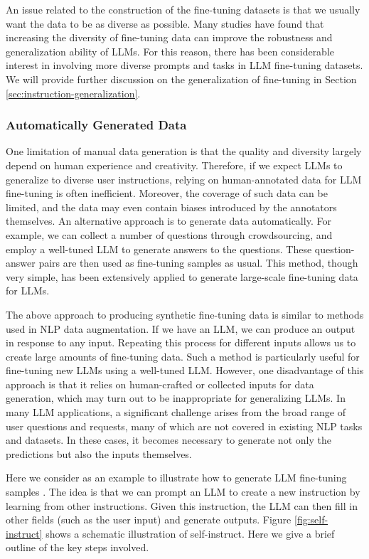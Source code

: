 An issue related to the construction of the fine-tuning datasets is that we usually want the data to be as diverse as possible. Many studies have found that increasing the diversity of fine-tuning data can improve the robustness and generalization ability of LLMs. For this reason, there has been considerable interest in involving more diverse prompts and tasks in LLM fine-tuning datasets. We will provide further discussion on the generalization of fine-tuning in Section \ref{sec:instruction-generalization}.

\subsubsection{Automatically Generated Data}

\noindent One limitation of manual data generation is that the quality and diversity largely depend on human experience and creativity. Therefore, if we expect LLMs to generalize to diverse user instructions, relying on human-annotated data for LLM fine-tuning is often inefficient. Moreover, the coverage of such data can be limited, and the data may even contain biases introduced by the annotators themselves. An alternative approach is to generate data automatically. For example, we can collect a number of questions through crowdsourcing, and employ a well-tuned LLM to generate answers to the questions. These question-answer pairs are then used as fine-tuning samples as usual. This method, though very simple, has been extensively applied to generate large-scale fine-tuning data for LLMs.

The above approach to producing synthetic fine-tuning data is similar to methods used in NLP data augmentation. If we have an LLM, we can produce an output in response to any input. Repeating this process for different inputs allows us to create large amounts of fine-tuning data.  Such a method is particularly useful for fine-tuning new LLMs using a well-tuned LLM. However, one disadvantage of this approach is that it relies on human-crafted or collected inputs for data generation, which may turn out to be inappropriate for generalizing LLMs. In many LLM applications, a significant challenge arises from the broad range of user questions and requests, many of which are not covered in existing NLP tasks and datasets. In these cases, it becomes necessary to generate not only the predictions but also the inputs themselves.

Here we consider  as an example to illustrate how to generate LLM fine-tuning samples \cite{wang-etal:2023selfinstruct,honovich-etal:2023unnatural}. The idea is that we can prompt an LLM to create a new instruction by learning from other instructions. Given this instruction, the LLM can then fill in other fields (such as the user input) and generate outputs. Figure \ref{fig:self-instruct} shows a schematic illustration of self-instruct. Here we give a brief outline of the key steps involved.


